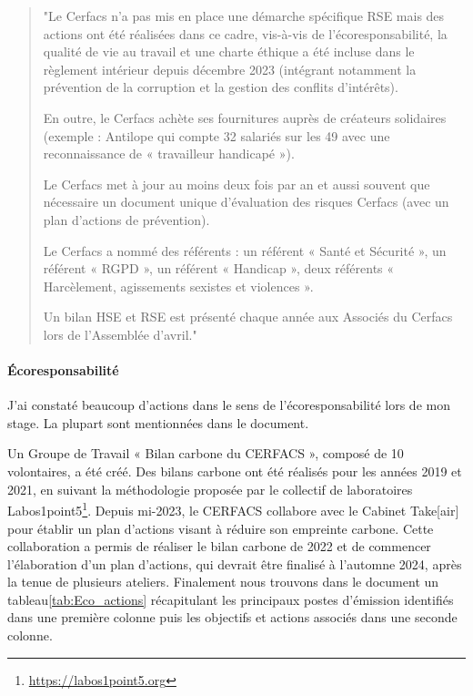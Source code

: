 \begin{quote}
\setlength{\leftmargin}{0.5cm} %
\setlength{\rightmargin}{0.5cm} %
    "Le Cerfacs n’a pas mis en place une démarche spécifique RSE mais des actions ont été réalisées dans
    ce cadre, vis-à-vis de l’écoresponsabilité, la qualité de vie au travail et une charte éthique a été
    incluse dans le règlement intérieur depuis décembre 2023 (intégrant notamment la prévention de la
    corruption et la gestion des conflits d’intérêts).
    \hspace{0,5cm}

    En outre, le Cerfacs achète ses fournitures auprès de créateurs solidaires (exemple : Antilope qui
    compte 32 salariés sur les 49 avec une reconnaissance de « travailleur handicapé »).
    \hspace{0,5cm}

    Le Cerfacs met à jour au moins deux fois par an et aussi souvent que nécessaire un document unique
    d’évaluation des risques Cerfacs (avec un plan d’actions de prévention).
    \hspace{0,5cm}

    Le Cerfacs a nommé des référents : un référent « Santé et Sécurité », un référent « \ac{RGPD} », un
    référent « Handicap », deux référents « Harcèlement, agissements sexistes et violences ».

    Un bilan HSE et RSE est présenté chaque année aux Associés du Cerfacs lors de l’Assemblée d’avril."
\end{quote}



\paragraph{Écoresponsabilité}
\hspace{0,5cm}

    J'ai constaté beaucoup d'actions dans le sens de l'écoresponsabilité lors de mon stage. La plupart sont mentionnées dans le document.
    \vspace{0,5cm}

    Un Groupe de Travail « Bilan carbone du CERFACS », composé de 10 volontaires, a été créé. Des bilans carbone ont été réalisés pour les années 2019 et 2021, en suivant la méthodologie proposée par le collectif de laboratoires Labos1point5\footnote{\url{https://labos1point5.org}}. Depuis mi-2023, le CERFACS collabore avec le Cabinet Take[air] pour établir un plan d’actions visant à réduire son empreinte carbone. Cette collaboration a permis de réaliser le bilan carbone de 2022 et de commencer l'élaboration d'un plan d'actions, qui devrait être finalisé à l’automne 2024, après la tenue de plusieurs ateliers. Finalement nous trouvons dans le document un tableau\ref{tab:Eco_actions} récapitulant les principaux postes d'émission identifiés dans une première colonne puis les objectifs et actions associés dans une seconde colonne.

